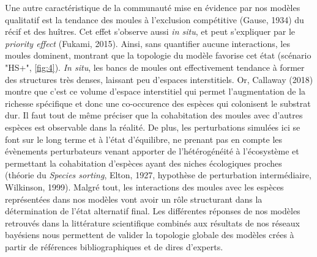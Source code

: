 \documentclass[12pt]{report}
\begin{document}
Une autre caractéristique de la communauté mise en évidence par nos modèles qualitatif est la tendance des moules à l’exclusion compétitive (Gause, 1934) du récif et des huîtres. Cet effet s'observe aussi \textit{in situ}, et peut s'expliquer par le \textit{priority effect} (Fukami, 2015). Ainsi, sans quantifier aucune interactions, les moules dominent, montrant que la topologie du modèle favorise cet état (scénario "HS+", \autoref{fig:4}). \textit{In situ}, les bancs de moules ont effectivement tendance à former des structures très denses, laissant peu d’espaces interstitiels. Or, Callaway (2018) montre que c’est ce volume d’espace interstitiel qui permet l’augmentation de la richesse spécifique et donc une co-occurence des espèces qui colonisent le substrat dur. Il faut tout de même préciser que la cohabitation des moules avec d’autres espèces est observable dans la réalité. De plus, les perturbations simulées ici se font sur le long terme et à l’état d’équilibre, ne prenant pas en compte les évènements perturbateurs venant apporter de l’hétérogénéité à l’écosystème et permettant la cohabitation d’espèces ayant des niches écologiques proches (théorie du \textit{Species sorting}, Elton, 1927, hypothèse de perturbation intermédiaire, Wilkinson, 1999). Malgré tout, les interactions des moules avec les espèces représentées dans nos modèles vont avoir un rôle structurant dans la détermination de l’état alternatif final. Les différentes réponses de nos modèles retrouvés dans la littérature scientifique combinés aux résultats de nos réseaux bayésiens nous permettent de valider la topologie globale des modèles crées à partir de références bibliographiques et de dires d’experts.
\end{document}
